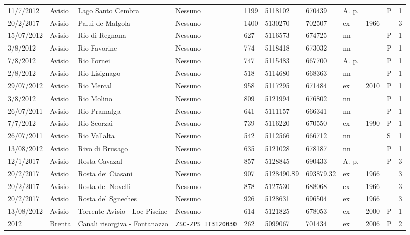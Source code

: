 \documentclass[11pt,a4paper,italian,twoside,openany]{memoir}
\begin{document}
\begin{longtable}[c]{p{}p{}p{}p{}p{}p{}p{}p{}p{}p{}l}
11/7/2012 & Avisio & Lago Santo Cembra   & Nessuno & 1199  & 5118102  & 670439 & A. p.  &   & P & 1   \\
\rowcolor[HTML]{EFEFEF} 20/2/2017 & Avisio & Palui de Malgola & Nessuno & 1400  & 5130270  & 702507 & ex   & 1966  &  & 3   \\
15/07/2012 & Avisio & Rio di Regnana & Nessuno & 627 & 5116573  & 674725 & nn   &   & P & 1   \\
\rowcolor[HTML]{EFEFEF} 3/8/2012  & Avisio & Rio Favorine   & Nessuno & 774 & 5118418  & 673032 & nn   &   & P & 1   \\
7/8/2012  & Avisio & Rio Fornei & Nessuno & 747 & 5115483  & 667700 & A. p.  &   & P & 1   \\
\rowcolor[HTML]{EFEFEF} 2/8/2012  & Avisio & Rio Lisignago  & Nessuno & 518 & 5114680  & 668363 & nn   &   & P & 1   \\
29/07/2012 & Avisio & Rio Mercal & Nessuno & 958 & 5117295  & 671484 & ex   & 2010  & P & 1   \\
\rowcolor[HTML]{EFEFEF} 3/8/2012  & Avisio & Rio Molino & Nessuno & 809 & 5121994  & 676802 & nn   &   & P & 1   \\
26/07/2011 & Avisio & Rio Pramalga   & Nessuno & 641 & 5111157  & 666341 & nn   &   & P & 1   \\
\rowcolor[HTML]{EFEFEF} 7/7/2012  & Avisio & Rio Scorzai & Nessuno & 739 & 5116220  & 670550 & ex   & 1990  & P & 1   \\
26/07/2011 & Avisio & Rio Vallalta   & Nessuno & 542 & 5112566  & 666712 & nn   &   & S & 1   \\
\rowcolor[HTML]{EFEFEF} 13/08/2012 & Avisio & Rivo di Brusago & Nessuno & 635 & 5121028  & 678187 & nn   &   & P & 1   \\
12/1/2017 & Avisio & Rosta Cavazal  & Nessuno & 857 & 5128845  & 690433 & A. p.  &   & P & 3   \\
\rowcolor[HTML]{EFEFEF} 20/2/2017 & Avisio & Rosta dei Ciasani   & Nessuno & 907 & 5128490.89 & 693879.32 & ex   & 1966  &  & 3   \\
20/2/2017 & Avisio & Rosta del Novelli   & Nessuno & 878 & 5127530  & 688068 & ex   & 1966  &  & 3   \\
\rowcolor[HTML]{EFEFEF} 20/2/2017 & Avisio & Rosta del Sgneches & Nessuno & 926 & 5128631  & 696504 & ex   & 1966  &  & 3   \\
13/08/2012 & Avisio & Torrente Avisio - Loc Piscine  & Nessuno & 614 & 5121825  & 678053 & ex   & 2000  & P & 1   \\
\rowcolor[HTML]{EFEFEF} 2012  & Brenta & Canali risorgiva - Fontanazzo  & \texttt{ZSC-ZPS IT3120030} & 262 & 5099067  & 701434 & ex   & 2006  & P & 2   \\

\end{longtable}
\end{document}
